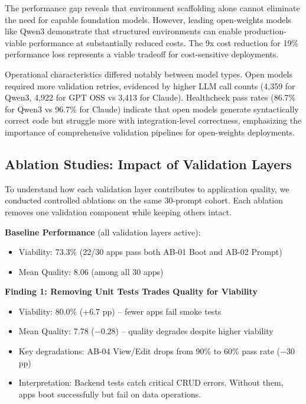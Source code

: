 \documentclass{article}
\begin{document}
The performance gap reveals that environment scaffolding alone cannot eliminate the need for capable foundation models. However, leading open-weights models like Qwen3 demonstrate that structured environments can enable production-viable performance at substantially reduced costs. The 9x cost reduction for 19\% performance loss represents a viable tradeoff for cost-sensitive deployments.

Operational characteristics differed notably between model types. Open models required more validation retries, evidenced by higher LLM call counts (4,359 for Qwen3, 4,922 for GPT OSS vs 3,413 for Claude). Healthcheck pass rates (86.7\% for Qwen3 vs 96.7\% for Claude) indicate that open models generate syntactically correct code but struggle more with integration-level correctness, emphasizing the importance of comprehensive validation pipelines for open-weights deployments.

\subsection{Ablation Studies: Impact of Validation Layers}

To understand how each validation layer contributes to application quality, we conducted controlled ablations on the same 30-prompt cohort. Each ablation removes one validation component while keeping others intact.

\textbf{Baseline Performance} (all validation layers active):
\begin{itemize}
\item Viability: 73.3\% (22/30 apps pass both AB-01 Boot and AB-02 Prompt)
\item Mean Quality: 8.06 (among all 30 apps)
\end{itemize}

\textbf{Finding 1: Removing Unit Tests Trades Quality for Viability}
\begin{itemize}
\item Viability: 80.0\% (+6.7 pp) -- fewer apps fail smoke tests
\item Mean Quality: 7.78 ($-0.28$) -- quality degrades despite higher viability
\item Key degradations: AB-04 View/Edit drops from 90\% to 60\% pass rate ($-30$ pp)
\item Interpretation: Backend tests catch critical CRUD errors. Without them, apps boot successfully but fail on data operations.
\end{itemize}
\end{document}
